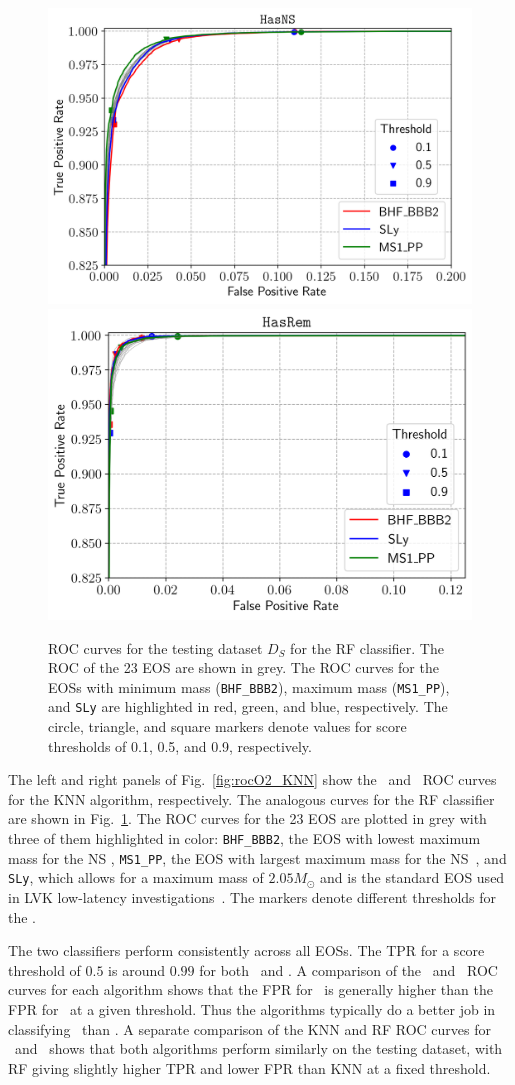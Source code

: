 \begin{figure}[h]
\includegraphics[width=0.45\linewidth]{roc_testing_RF_NS}
\includegraphics[width=0.45\linewidth]{roc_testing_RF_REM}
\caption{\ac{ROC} curves for the testing dataset $D_S$ for the \ac{RF} classifier. The \ac{ROC} of the 23 \ac{EOS} are shown in grey. The \ac{ROC} curves for the \ac{EOS}s with minimum mass ({\tt BHF\_BBB2}), maximum mass ({\tt MS1\_PP}), and {\tt SLy} are highlighted in red, green, and blue, respectively. The circle, triangle, and square markers denote values for score thresholds of 0.1, 0.5, and 0.9, respectively.}
\label{fig:rocO2_RF}
\end{figure}

The left and right panels of Fig.~\ref{fig:rocO2_KNN} show the \hasns\ and \hasrem\ \ac{ROC} curves for the \ac{KNN} algorithm, respectively. The analogous curves for the \ac{RF}
classifier are shown in Fig.~\ref{fig:rocO2_RF}. The \ac{ROC} curves for the 23 \ac{EOS} are plotted in grey with three of them highlighted in color: {\tt BHF\_BBB2}, the \ac{EOS} with
lowest maximum mass for the NS , {\tt MS1\_PP}, the \ac{EOS} with largest maximum mass for the \ac{NS}~\cite{Ghosh:2021eqv}, and {\tt SLy}, which allows for a
maximum mass of $2.05 M_\odot$ and is the standard \ac{EOS} used in \ac{LVK} low-latency investigations~\cite{Chaudhary:2023vec}. The markers denote different thresholds for the . 

The two classifiers perform consistently across all \ac{EOS}s. The \ac{TPR} for a score threshold of $0.5$ is around $0.99$ for both \hasns\ and \hasrem. A comparison of the
\hasns\ and \hasrem\ \ac{ROC} curves for each algorithm shows that the \ac{FPR} for \hasns\ is generally higher than the \ac{FPR} for \hasrem\ at a given threshold. Thus the algorithms
typically do a better job in classifying \hasrem\ than \hasns. A separate comparison of the \ac{KNN} and \ac{RF} \ac{ROC} curves for \hasns\ and \hasrem\ shows that both algorithms perform
similarly on the testing dataset, with \ac{RF} giving slightly higher \ac{TPR} and lower \ac{FPR} than \ac{KNN} at a fixed threshold. 

